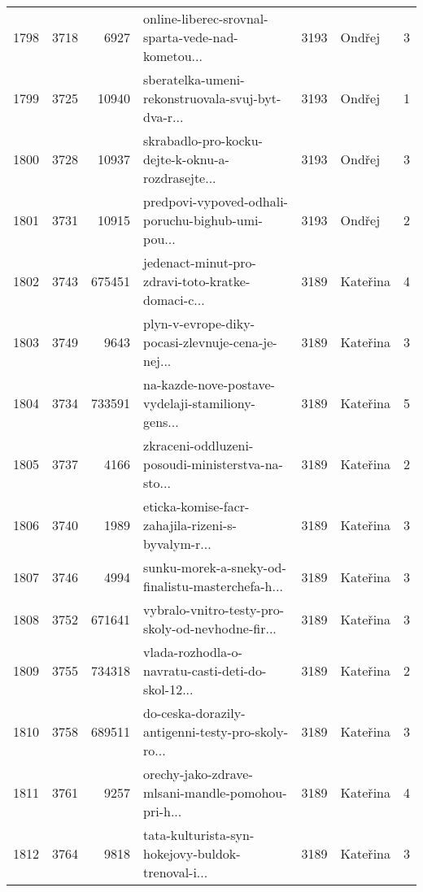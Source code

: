 \begin{tabular}{lrrlrlr}
1798 &       3718 &     6927 &  online-liberec-srovnal-sparta-vede-nad-kometou... &     3193 &                       Ondřej &               3 \\
1799 &       3725 &    10940 &  sberatelka-umeni-rekonstruovala-svuj-byt-dva-r... &     3193 &                       Ondřej &               1 \\
1800 &       3728 &    10937 &  skrabadlo-pro-kocku-dejte-k-oknu-a-rozdrasejte... &     3193 &                       Ondřej &               3 \\
1801 &       3731 &    10915 &  predpovi-vypoved-odhali-poruchu-bighub-umi-pou... &     3193 &                       Ondřej &               2 \\
1802 &       3743 &   675451 &  jedenact-minut-pro-zdravi-toto-kratke-domaci-c... &     3189 &                     Kateřina &               4 \\
1803 &       3749 &     9643 &  plyn-v-evrope-diky-pocasi-zlevnuje-cena-je-nej... &     3189 &                     Kateřina &               3 \\
1804 &       3734 &   733591 &  na-kazde-nove-postave-vydelaji-stamiliony-gens... &     3189 &                     Kateřina &               5 \\
1805 &       3737 &     4166 &  zkraceni-oddluzeni-posoudi-ministerstva-na-sto... &     3189 &                     Kateřina &               2 \\
1806 &       3740 &     1989 &  eticka-komise-facr-zahajila-rizeni-s-byvalym-r... &     3189 &                     Kateřina &               3 \\
1807 &       3746 &     4994 &  sunku-morek-a-sneky-od-finalistu-masterchefa-h... &     3189 &                     Kateřina &               3 \\
1808 &       3752 &   671641 &  vybralo-vnitro-testy-pro-skoly-od-nevhodne-fir... &     3189 &                     Kateřina &               3 \\
1809 &       3755 &   734318 &  vlada-rozhodla-o-navratu-casti-deti-do-skol-12... &     3189 &                     Kateřina &               2 \\
1810 &       3758 &   689511 &  do-ceska-dorazily-antigenni-testy-pro-skoly-ro... &     3189 &                     Kateřina &               3 \\
1811 &       3761 &     9257 &  orechy-jako-zdrave-mlsani-mandle-pomohou-pri-h... &     3189 &                     Kateřina &               4 \\
1812 &       3764 &     9818 &  tata-kulturista-syn-hokejovy-buldok-trenoval-i... &     3189 &                     Kateřina &               3 \\

\end{tabular}
